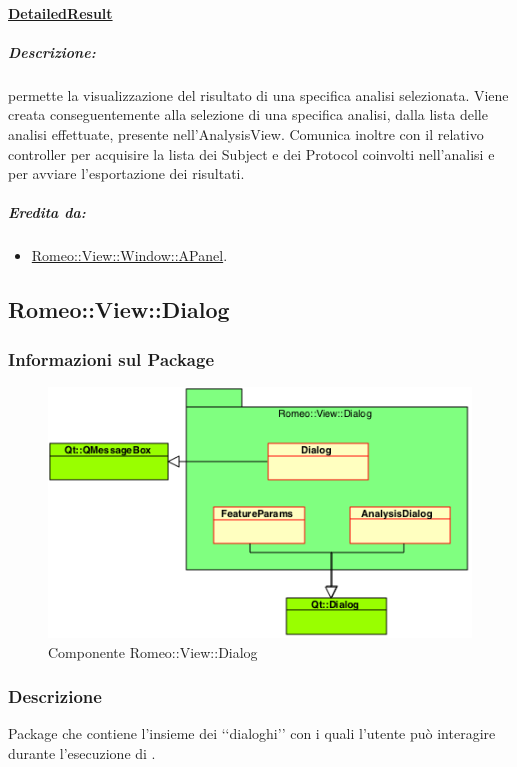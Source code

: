 	\paragraph{\underline{DetailedResult}}
	\label{drv}
		\subparagraph{Descrizione:} permette la visualizzazione del risultato di una specifica analisi selezionata. Viene creata conseguentemente alla selezione di una specifica analisi, dalla lista delle analisi effettuate, presente nell'AnalysisView. Comunica inoltre con il relativo controller per acquisire la lista dei Subject\glossario{} e dei Protocol\glossario{} coinvolti nell'analisi e per avviare l'esportazione dei risultati.
		\subparagraph{Eredita da:}
			\begin{itemize}
				\item \hyperref[ab_panel]{Romeo::View::Window::APanel}.
			\end{itemize}
			

	\subsection{Romeo::View::Dialog}
	\label{romeo::view::dialog}
		\subsubsection{Informazioni sul Package}
		\label{info_dialog}		
		\begin{figure}[!h]
			\centering
			\includegraphics[width=\linewidth]{./Content/Immagini/Romeo__View__Dialog.png}
			\caption{Componente Romeo::View::Dialog}
			\label{comp_romeo::view::dialog}
		\end{figure}	
		\subsubsection{Descrizione}
		\label{descr_dialog}
		Package\glossario{} che contiene l'insieme dei \lq\lq{}dialoghi\rq\rq{} con i quali l'utente può interagire durante l'esecuzione di \project{}.
